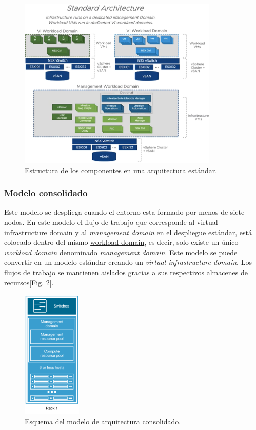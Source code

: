 \begin{figure}[h!]
  \centering
  \includegraphics[width=0.85\textwidth]{imaxes/conceptosPrevios/standardArch.png}
  \caption{Estructura de los componentes en una arquitectura estándar.}
  \label{fig:standardarch}
\end{figure}
\FloatBarrier
\subsubsection{Modelo consolidado}
Este modelo se despliega cuando el entorno esta formado por menos de siete nodos. En este modelo el flujo de trabajo que corresponde al \underline{virtual infrastructure domain} y al \textit{management domain} en el despliegue estándar, está colocado dentro del mismo \underline{workload domain}, es decir, solo existe un único \textit{workload domain} denominado \textit{management domain}. Este modelo se puede convertir en un modelo estándar creando un \textit{virtual infrastructure domain}. Los flujos de trabajo se mantienen aislados gracias a sus respectivos almacenes de recursos[Fig. \ref{fig:modeloconsolidated}].

\begin{figure}[h!]
  \centering
  \includegraphics[width=0.25\textwidth]{imaxes/conceptosPrevios/modelConsolidated.png}
  \caption{Esquema del modelo de arquitectura consolidado.}
  \label{fig:modeloconsolidated}
\end{figure}

